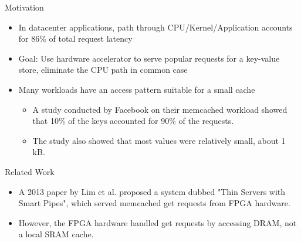 \begin{block}{Motivation}
    \begin{itemize}
        \item In datacenter applications, path through CPU/Kernel/Application accounts for 86\% of total request latency
        \item Goal: Use hardware accelerator to serve popular requests for a key-value store, eliminate the CPU path in common case
        \item Many workloads have an access pattern suitable for a small cache
            \begin{itemize}
                \item A study conducted by Facebook on their memcached workload
                    showed that 10\% of the keys accounted for 90\% of the
                    requests.
                \item The study also showed that most values were relatively
                    small, about 1 kB.
            \end{itemize}

    \end{itemize}

\end{block}

\vspace{1ex}

\begin{block}{Related Work}
\begin{itemize}
    \item A 2013 paper by Lim et al. proposed a system dubbed
        "Thin Servers with Smart Pipes", which served memcached get requests
        from FPGA hardware.
    \item However, the FPGA hardware handled get requests by accessing DRAM,
        not a local SRAM cache.
\end{itemize}

\end{block}

